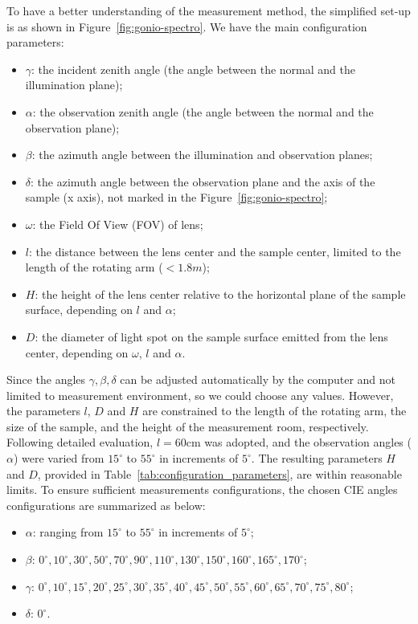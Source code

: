 To have a better understanding of the measurement method, the simplified set-up is as shown in Figure~\ref{fig:gonio-spectro}.
We have the main configuration parameters:
\begin{itemize}
    \item $\gamma$: the incident zenith angle (the angle between the normal and the illumination plane);
    \item $\alpha$: the observation zenith angle (the angle between the normal and the observation plane);
    \item $\beta$: the azimuth angle between the illumination and observation planes;
    \item $\delta$: the azimuth angle between the observation plane and the axis of the sample (x axis), not marked in the Figure~\ref{fig:gonio-spectro};
    \item $\omega$: the Field Of View (FOV) of lens;
    \item $l$: the distance between the lens center and the sample center, limited to the length of the rotating arm ($<1.8m$);
    \item $H$: the height of the lens center relative to the horizontal plane of the sample surface, depending on $l$ and $\alpha$;
    \item $D$: the diameter of light spot on the sample surface emitted from the lens center, depending on $\omega$, $l$ and $\alpha$.
\end{itemize}
Since the angles $\gamma, \beta, \delta$ can be adjusted automatically by the computer and not limited to measurement environment, so we could choose any values.
However, the parameters $l$, $D$ and $H$ are constrained to the length of the rotating arm, the size of the sample, and the height of the measurement room, respectively.
Following detailed evaluation, $l = 60\mathrm{cm}$ was adopted, and the observation angles ($\alpha$) were varied from $15^\circ$ to $55^\circ$ in increments of $5^\circ$.
The resulting parameters $H$ and $D$, provided in Table~\ref{tab:configuration_parameters}, are within reasonable limits.
To ensure sufficient measurements configurations, the chosen CIE angles configurations are summarized as below:
\begin{itemize}
    \item $\alpha$: ranging from $15^\circ$ to $55^\circ$ in increments of $5^\circ$;
    \item $\beta$: $0^\circ, 10^\circ, 30^\circ, 50^\circ, 70^\circ, 90^\circ, 110^\circ, 130^\circ, 150^\circ, 160^\circ, 165^\circ, 170^\circ$;
    \item $\gamma$: $0^\circ, 10^\circ, 15^\circ, 20^\circ, 25^\circ, 30^\circ, 35^\circ, 40^\circ, 45^\circ, 50^\circ, 55^\circ, 60^\circ, 65^\circ, 70^\circ, 75^\circ, 80^\circ$;
    \item $\delta$: $0^\circ$.
\end{itemize}

